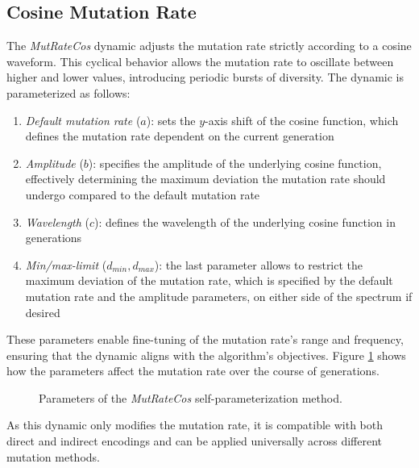 \documentclass[english,examples]{isasthesis}
\begin{document}
\subsection{Cosine Mutation Rate}
\label{CosineMutationRate}
The \textit{MutRateCos} dynamic adjusts the mutation rate strictly according to
a cosine waveform. This cyclical behavior allows the mutation rate to oscillate
between higher and lower values, introducing periodic bursts of diversity.
The dynamic is parameterized as follows:
\begin{enumerate}
    \item   \textit{Default mutation rate} ($a$): sets the $y$-axis shift of
            the cosine function, which defines the mutation rate dependent on
            the current generation

    \item   \textit{Amplitude} ($b$): specifies the amplitude of the underlying
            cosine function, effectively determining the maximum deviation the
            mutation rate should undergo compared to the default mutation rate

    \item   \textit{Wavelength} ($c$): defines the wavelength of the underlying
            cosine function in generations

    \item   \textit{Min/max-limit} ($d_{min}, d_{max}$): the last parameter
            allows to restrict the maximum deviation of the mutation rate,
            which is specified by the default mutation rate and the amplitude
            parameters, on either side of the spectrum if desired
\end{enumerate}
These parameters enable fine-tuning of the mutation rate's range and frequency,
ensuring that the dynamic aligns with the algorithm's objectives.
Figure \ref{fig:mut_rate_cos} shows how the parameters affect the mutation
rate over the course of generations.
\begin{figure}[]
    \centering
    
    \caption{
        Parameters of the \textit{MutRateCos} self-parameterization method.
    }
    \label{fig:mut_rate_cos}
\end{figure}

As this dynamic only modifies the mutation rate, it is compatible with both
direct and indirect encodings and can be applied universally across different
mutation methods.
\end{document}
